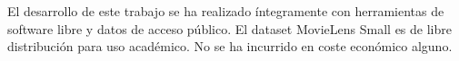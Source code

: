 El desarrollo de este trabajo se ha realizado íntegramente con herramientas de software libre y datos de acceso público. El dataset MovieLens Small es de libre distribución para uso académico. No se ha incurrido en coste económico alguno.
